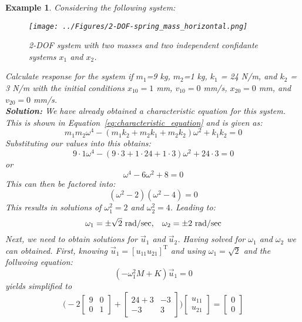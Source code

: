 \documentclass[12pt,letter]{article}
\newtheorem{ex}{Example}
\numberwithin{ex}{section} %
\newenvironment{example}{\begin{mdframed}[middlelinewidth=0.5mm]\begin{ex}\normalfont}{\end{ex}\end{mdframed}}
\numberwithin{re}{section} %
\begin{document}
\begin{example}
\label{ex:2-DOF}
Considering the following system:
\begin{figure}[H]
	\centering
	\texttt{[image: ../Figures/2-DOF-spring\_mass\_horizontal.png]}
	\caption{2-DOF system with two masses and two independent confidante systems $x_1$ and $x_2$.}
\end{figure}
Calculate response for the system if $m_1$=9 kg, $m_2$=1 kg, $k_1$ = 24 N/m, and $k_2$ = 3 N/m with the initial conditions $x_{10}=1$ mm, $v_{10}=0$ mm/s, $x_{20}=0$ mm, and $v_{20}=0$ mm/s. \\


\noindent \textbf{Solution:} We have already obtained a characteristic equation for this system. This is shown in Equation~\ref{eq:characteristic_equation} and is given as:
\begin{equation}
m_1 m_2 \omega^4 - (m_1 k_2 + m_2 k_1 + m_2 k_2)\omega^2 + k_1 k_2 = 0
\end{equation}
Substituting our values into this obtains:
\begin{equation}
9 \cdot 1 \omega^4 - (9 \cdot 3 + 1 \cdot 24 + 1 \cdot 3)\omega^2 + 24 \cdot 3 = 0
\end{equation}
or
\begin{equation}
\omega^4 - 6\omega^2 + 8 =0
\end{equation}
This can then be factored into:
\begin{equation}
(\omega^2-2)(\omega^2-4)=0
\end{equation}
This results in solutions of $\omega^2_1 = 2$ and $\omega^2_2 = 4$. Leading to:
\begin{equation}
\omega_1 = \pm \sqrt{2} \text{ rad/sec}, \hspace{2ex} \omega_2 = \pm 2 \text{ rad/sec}
\end{equation}
Next, we need to obtain solutions for $\vec{u}_1$ and $\vec{u}_2$. Having solved for $\omega_1$ and $\omega_2$ we can obtained. First, knowing $\vec{u}_1 = [u_{11} u_{21}]^\text{T}$ and using $\omega_1 = \sqrt{2}$ and the follwoing equation:
\begin{equation}
	(-\omega_1^2 M  + K)\vec{u}_1 =0
\end{equation}
yields
simplified to
\begin{equation}
	 \bigg(-2\begin{bmatrix} 9 & 0 \\   0  & 1 \end{bmatrix} + \begin{bmatrix} 24+3 & -3 \\    -3  & 3 \end{bmatrix}\bigg)\begin{bmatrix} u_{11}\\ u_{21}\end{bmatrix} = \begin{bmatrix} 0\\ 0\end{bmatrix}

\end{equation}
\end{example}
\end{document}
